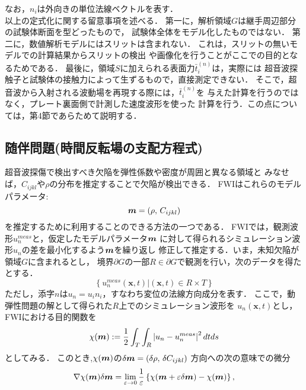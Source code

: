 なお，$n_i$は外向きの単位法線ベクトルを表す．
\\
\hspace{\parindent}
以上の定式化に関する留意事項を述べる．
第一に，解析領域$G$は継手周辺部分の試験体断面を型どったもので，
試験体全体をモデル化したものではない．
第二に，数値解析モデルにはスリットは含まれない．
これは，スリットの無いモデルでの計算結果からスリットの検出
や画像化を行うことがここでの目的となるためである．
最後に，領域$S$に加えられる表面力$\bar{t}_i^{(n)}$は，実際には
超音波探触子と試験体の接触力によって生ずるもので，直接測定できない．
そこで，超音波から入射される波動場を再現する際には，$\bar{t}^{(n)}_i$を
与えた計算を行うのではなく，プレート裏面側で計測した速度波形を使った
計算を行う．この点については，第4節であらためて説明する．
\subsection{随伴問題(時間反転場の支配方程式)}
超音波探傷で検出すべき欠陥を弾性係数や密度が周囲と異なる領域と
みなせば，$C_{ijkl}$や$\rho$の分布を推定することで欠陥が検出できる．
FWIはこれらのモデルパラメータ:
\begin{equation}
	\boldsymbol{m}=\left( \rho, \, C_{ijkl}\right)
	\label{eqn:mprms}
\end{equation}
を推定するために利用することのできる方法の一つである．
FWIでは，観測波形$u_n^{meas}$と，仮定したモデルパラメータ$\boldsymbol{m}$
に対して得られるシミュレーション波形$u_n$の差を最小化するよう$\boldsymbol{m}$を繰り返し
修正して推定する．いま，未知欠陥が領域$G$に含まれるとし，
境界$\partial G$の一部$R\in\partial G$で観測を行い，次のデータを得たとする．
\begin{equation}
	\left\{ 
	\left. 
	u_n^{meas}(\boldsymbol{x},t)\right|  (\boldsymbol{x},t)\in R\times T
	\right\}
	\label{eqn:data}
\end{equation}
ただし，添字$n$は$u_n=u_in_i$，すなわち変位の法線方向成分を表す．
ここで，動弾性問題の解として得られた$R$上でのシミュレーション波形を
$u_n(\boldsymbol{x},t)$とし，FWIにおける目的関数を
\begin{equation}
	\chi(\boldsymbol{m}):= \frac{1}{2} \int _T\int _R \left|u_n-u_n^{meas}\right|^2 dtds
	\label{eqn:cost}
\end{equation}
としてみる．
このとき,$\chi(\boldsymbol{m})$の$\delta \boldsymbol{m}=(\delta \rho,\, \delta C_{ijkl})$
方向への次の意味での微分
\begin{equation}
	\nabla \chi (\boldsymbol{m})\delta \boldsymbol{m} = \lim_{\varepsilon \rightarrow 0}
	\frac{1}{\varepsilon}
	\left\{
		\chi(\boldsymbol{m}+\varepsilon \delta \boldsymbol{m})
		-
		\chi(\boldsymbol{m})
	\right\}, 
	\label{eqn:del_chi}
\end{equation}
